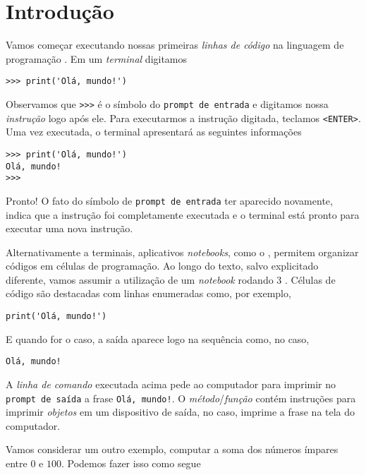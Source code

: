\chapter{Introdução}\label{cap_intro}

Vamos começar executando nossas primeiras \emph{linhas de código} na linguagem de programação {\python}. Em um \emph{terminal} {\python} digitamos

\begin{lstlisting}
>>> print('Olá, mundo!')
\end{lstlisting}

Observamos que \lstinline+>>>+ é o símbolo do \texttt{prompt de entrada} e digitamos nossa \emph{instrução} logo após ele. Para executarmos a instrução digitada, teclamos \texttt{<ENTER>}. Uma vez executada, o terminal apresentará as seguintes informações

\begin{lstlisting}
>>> print('Olá, mundo!')
Olá, mundo!
>>> 
\end{lstlisting}

Pronto! O fato do símbolo de \texttt{prompt de entrada} ter aparecido novamente, indica que a instrução foi completamente executada e o terminal está pronto para executar uma nova instrução.

Alternativamente a terminais, aplicativos \textit{notebooks}, como o {\jupyter}, permitem organizar códigos {\python} em células de programação. Ao longo do texto, salvo explicitado diferente, vamos assumir a utilização de um \textit{notebook} {\jupyter} rodando {\python} 3 \cite{Python2024a}. Células de código são destacadas com linhas enumeradas como, por exemplo,

\begin{lstlisting}
print('Olá, mundo!')
\end{lstlisting}

E quando for o caso, a saída aparece logo na sequência como, no caso,

\begin{verbatim}
Olá, mundo!
\end{verbatim}

A \emph{linha de comando} executada acima pede ao computador para imprimir no \texttt{prompt de saída} a frase \texttt{Olá, mundo!}. O \emph{método}/\emph{função} {\PYTHONprint} contém instruções para imprimir \emph{objetos} em um dispositivo de saída, no caso, imprime a frase na tela do computador.

Vamos considerar um outro exemplo, computar a soma dos números ímpares entre $0$ e $100$. Podemos fazer isso como segue

